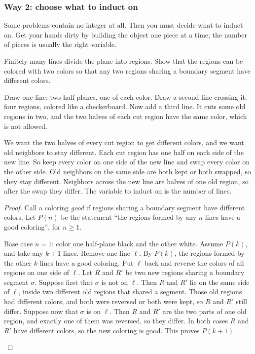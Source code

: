 \documentclass[10pt]{scrartcl}
\renewcommand{\S}{\ensuremath{\mathsection}}
\begin{document}
\subsubsection*{Way 2: choose what to induct on}
Some problems contain no integer at all. Then you must decide what to induct on. Get your hands dirty by building the object one piece at a time; the number of pieces is usually the right variable.

\begin{example*}[P\&B \S1.2; ACPS 2.3.7: two-coloring the regions of lines]
  Finitely many lines divide the plane into regions. Show that the regions can be colored with two colors so that any two regions sharing a boundary segment have different colors.
\end{example*}

Draw one line: two half-planes, one of each color. Draw a second line crossing it: four regions, colored like a checkerboard. Now add a third line. It cuts some old regions in two, and the two halves of each cut region have the same color, which is not allowed.

\begin{ideabox}
  We want the two halves of every cut region to get different colors, and we want old neighbors to stay different. Each cut region has one half on each side of the new line. So keep every color on one side of the new line and swap every color on the other side. Old neighbors on the same side are both kept or both swapped, so they stay different. Neighbors across the new line are halves of one old region, so after the swap they differ. The variable to induct on is the number of lines.
\end{ideabox}

\begin{proof}
  Call a coloring \emph{good} if regions sharing a boundary segment have different colors. Let $P(n)$ be the statement ``the regions formed by any $n$ lines have a good coloring'', for $n \geq 1$.
  \begin{steps}
    \ii Base case $n = 1$: color one half-plane black and the other white.
    \ii Assume $P(k)$, and take any $k+1$ lines. Remove one line $\ell$. By $P(k)$, the regions formed by the other $k$ lines have a good coloring. Put $\ell$ back and reverse the colors of all regions on one side of $\ell$.
    \ii Let $R$ and $R'$ be two new regions sharing a boundary segment $\sigma$. Suppose first that $\sigma$ is not on $\ell$. Then $R$ and $R'$ lie on the same side of $\ell$, inside two different old regions that shared a segment. Those old regions had different colors, and both were reversed or both were kept, so $R$ and $R'$ still differ.
    \ii Suppose now that $\sigma$ is on $\ell$. Then $R$ and $R'$ are the two parts of one old region, and exactly one of them was reversed, so they differ.
    \ii In both cases $R$ and $R'$ have different colors, so the new coloring is good. This proves $P(k+1)$.
  \end{steps}
\end{proof}
\end{document}
